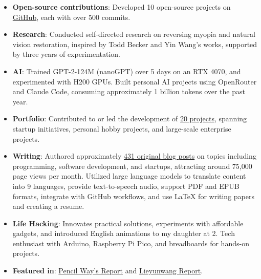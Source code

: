 \documentclass[a4paper,14pt]{article}
\begin{document}
\begin{itemize}
    \item \textbf{Open-source contributions}: Developed 10 open-source projects on \href{https://github.com/lzwjava}{GitHub}, each with over 500 commits.
    \item \textbf{Research}: Conducted self-directed research on reversing myopia and natural vision restoration, inspired by Todd Becker and Yin Wang’s works, supported by three years of experimentation.
    \item \textbf{AI}: Trained GPT-2-124M (nanoGPT) over 5 days on an RTX 4070, and experimented with H200 GPUs. Built personal AI projects using OpenRouter and Claude Code, consuming approximately 1 billion tokens over the past year.
    \item \textbf{Portfolio}: Contributed to or led the development of \href{https://lzwjava.com/pages/portfolio-en}{20 projects}, spanning startup initiatives, personal hobby projects, and large-scale enterprise projects.
    \item \textbf{Writing}: Authored approximately \href{https://lzwjava.com}{431 original blog posts} on topics including programming, software development, and startups, attracting around 75,000 page views per month. Utilized large language models to translate content into 9 languages, provide text-to-speech audio, support PDF and EPUB formats, integrate with GitHub workflows, and use LaTeX for writing papers and creating a resume.
    \item \textbf{Life Hacking}: Innovates practical solutions, experiments with affordable gadgets, and introduced English animations to my daughter at 2. Tech enthusiast with Arduino, Raspberry Pi Pico, and breadboards for hands-on projects.
    \item \textbf{Featured in}: \href{https://www.pencilnews.cn/p/13402.html}{Pencil Way's Report} and \href{https://lieyunpro.com/archives/290646}{Lieyunwang Report}.
\end{itemize}
\end{document}
